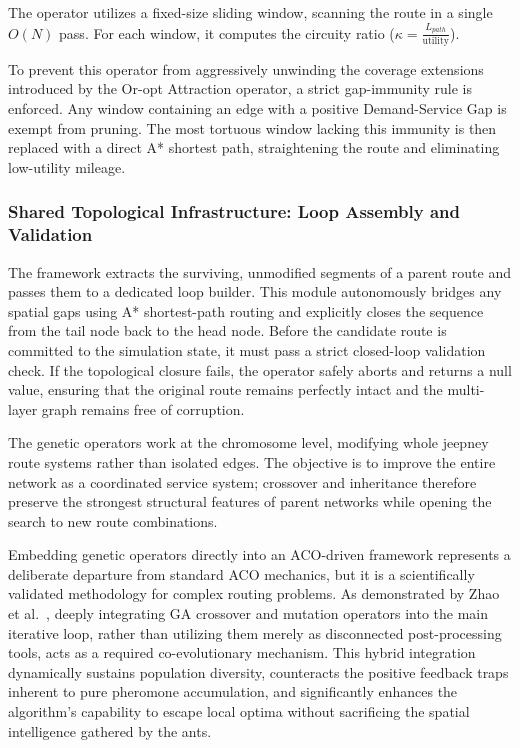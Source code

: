 {{The operator utilizes a fixed-size sliding window, scanning the route in a single $O(N)$ pass. For each window, it computes the circuity ratio ($\kappa = \frac{L_{path}}{\text{utility}}$). 

To prevent this operator from aggressively unwinding the coverage extensions introduced by the Or-opt Attraction operator, a strict gap-immunity rule is enforced. Any window containing an edge with a positive Demand-Service Gap is exempt from pruning. The most tortuous window lacking this immunity is then replaced with a direct A* shortest path, straightening the route and eliminating low-utility mileage.

\subsubsection{Shared Topological Infrastructure: Loop Assembly and Validation}
\label{sec:loop_validation}
\noindent The framework extracts the surviving, unmodified segments of a parent route and passes them to a dedicated loop builder. This module autonomously bridges any spatial gaps using A* shortest-path routing and explicitly closes the sequence from the tail node back to the head node. Before the candidate route is committed to the simulation state, it must pass a strict closed-loop validation check. If the topological closure fails, the operator safely aborts and returns a null value, ensuring that the original route remains perfectly intact and the multi-layer graph remains free of corruption.

\label{sec:genetic}
\noindent
The genetic operators work at the chromosome level, modifying whole jeepney route systems rather than isolated edges. The objective is to improve the entire network as a coordinated service system; crossover and inheritance therefore preserve the strongest structural features of parent networks while opening the search to new route combinations.

Embedding genetic operators directly into an ACO-driven framework represents a deliberate departure from standard ACO mechanics, but it is a scientifically validated methodology  for complex routing problems. As demonstrated by Zhao et al.\ \citeyearpar{zhao2026traversal}, deeply integrating \ac{GA} crossover and mutation operators into the main iterative loop, rather than utilizing them merely as disconnected post-processing tools, acts as a required co-evolutionary mechanism. This hybrid integration dynamically sustains population diversity, counteracts the positive feedback traps inherent to pure pheromone accumulation, and significantly enhances the algorithm's capability to escape local optima without sacrificing the spatial intelligence gathered by the ants.

}}

